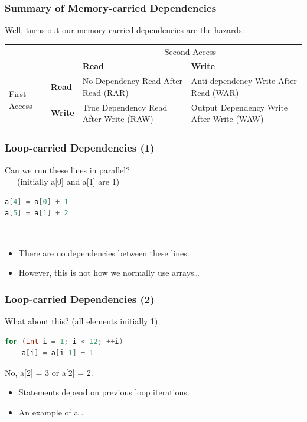 \begin{frame}
\frametitle{Summary of Memory-carried Dependencies}

Well, turns out our memory-carried dependencies are the hazards:
\begin{center}
\begin{tabular}{ll|p{2.8cm}p{3.2cm}}
& & \multicolumn{2}{c}{Second Access} \\ 
&  & \bf Read & \bf Write \\ \hline
\multirow{2}{*}{First Access} & \bf Read & No Dependency Read After Read (RAR)  & Anti-dependency Write After Read (WAR) \\[0.5em]
& \bf Write & True Dependency Read After Write (RAW) & Output Dependency Write After Write (WAW) \\
\end{tabular}
\end{center}
\end{frame}



\begin{frame}[fragile]
\frametitle{Loop-carried Dependencies (1)}

Can we run these lines in parallel? \\ ~~~(initially a[0] and a[1] are 1)
\begin{lstlisting}[language=C]
a[4] = a[0] + 1
a[5] = a[1] + 2
\end{lstlisting}
\pause
{}\\[1em]
\begin{itemize}
\item There are no dependencies between these lines.
\item However, this is not how we normally use arrays\ldots
\end{itemize}

\end{frame}

\begin{frame}[fragile]
\frametitle{Loop-carried Dependencies (2)}

What about this? (all elements initially 1)
\begin{lstlisting}[language=C]
for (int i = 1; i < 12; ++i)
    a[i] = a[i-1] + 1
\end{lstlisting}
\pause
\alert{No, a[2] = 3 or a[2] = 2.}\\[1em]
\begin{itemize}
\item Statements depend on previous loop iterations.
\item An example of a .
\end{itemize}

\end{frame}

